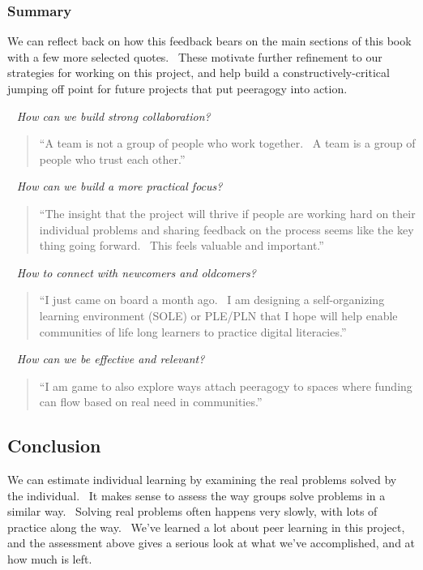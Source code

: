 \hypertarget{summary}{%
\subsubsection{Summary}\label{summary}}

We can reflect back on how this feedback bears on the main sections of
this book with a few more selected quotes.~ These motivate further
refinement to our strategies for working on this project, and help build
a constructively-critical jumping off point for future projects that put
peeragogy into action.

~ \emph{How can we build strong collaboration?}

\begin{quote}
``A team is not a group of people who work together.~ A team is a group
of people who trust each other.''
\end{quote}

~ \emph{How can we build a more practical focus?}

\begin{quote}
``The insight that the project will thrive if people are working hard on
their individual problems and sharing feedback on the process seems like
the key thing going forward.~ This feels valuable and important.''
\end{quote}

~ \emph{How to connect with newcomers and oldcomers?}

\begin{quote}
``I just came on board a month ago.~ I am designing a self-organizing
learning environment (SOLE) or PLE/PLN that I hope will help enable
communities of life long learners to practice digital literacies.''
\end{quote}

~ \emph{How can we be effective and relevant?}

\begin{quote}
``I am game to also explore ways attach peeragogy to spaces where
funding can flow based on real need in communities.''
\end{quote}

\hypertarget{conclusion}{%
\subsection{Conclusion}\label{conclusion}}

We can estimate individual learning by examining the real problems
solved by the individual.~ It makes sense to assess the way groups solve
problems in a similar way.~ Solving real problems often happens very
slowly, with lots of practice along the way.~ We've learned a lot about
peer learning in this project, and the assessment above gives a serious
look at what we've accomplished, and at how much is left.

